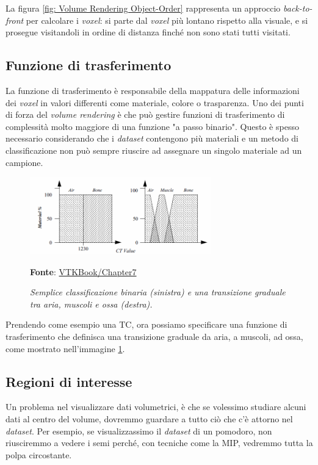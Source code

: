 La figura \ref{fig: Volume Rendering Object-Order} rappresenta un approccio \emph{back-to-front} per calcolare i \emph{voxel}: si parte dal \emph{voxel} più lontano rispetto alla visuale, e si prosegue visitandoli in ordine di distanza finché non sono stati tutti visitati.

\subsection{Funzione di trasferimento}\label{sec:funzione-trasferimento}
La funzione di trasferimento è responsabile della mappatura delle informazioni dei \emph{voxel} in valori differenti come materiale, colore o trasparenza. Uno dei punti di forza del \emph{volume rendering} è che può gestire funzioni di trasferimento di complessità molto maggiore di una funzione "a passo binario". Questo è spesso necessario considerando che i \emph{dataset} contengono più materiali e un metodo di classificazione non può sempre riuscire ad assegnare un singolo materiale ad un campione.

\begin{figure}[h]
    \centering
    \includegraphics[width=0.7\textwidth]{immagini/volumerendering/functions.png}
    \caption{\textit{Semplice classificazione binaria (sinistra) e una transizione graduale tra aria, muscoli e ossa (destra).}}
    \textbf{Fonte}: \href{https://lorensen.github.io/VTKExamples/site/VTKBook/07Chapter7/}{VTKBook/Chapter7}
    \label{fig: Funzione di Trasferimento}
\end{figure}

Prendendo come esempio una TC, ora possiamo specificare una funzione di trasferimento che definisca una transizione graduale da aria, a muscoli, ad ossa, come mostrato nell'immagine \ref{fig: Funzione di Trasferimento}.

\subsection{Regioni di interesse}\label{sec:regioni-di-interesse}
Un problema nel visualizzare dati volumetrici, è che se volessimo studiare alcuni dati al centro del volume, dovremmo guardare a tutto ciò che c'è attorno nel \emph{dataset}. Per esempio, se visualizzassimo il \emph{dataset} di un pomodoro, non riusciremmo a vedere i semi perché, con tecniche come la MIP, vedremmo tutta la polpa circostante.

